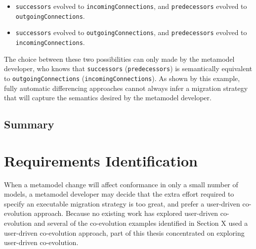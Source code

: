 \begin{itemize}
	\item \texttt{successors} evolved to \texttt{incomingConnections}, and \texttt{predecessors} evolved to \texttt{outgoingConnections}.
	\item \texttt{successors} evolved to \texttt{outgoingConnections}, and \texttt{predecessors} evolved to \texttt{incomingConnections}.
\end{itemize}

The choice between these two possibilities can only made by the metamodel developer, who knows that \texttt{successors} (\texttt{predecessors}) is semantically equivalent to \texttt{outgoingConnections} (\texttt{incomingConnections}). As shown by this example, fully automatic differencing approaches cannot always infer a migration strategy that will capture the semantics desired by the metamodel developer.


\subsection{Summary}


\section{Requirements Identification}
\label{sec:requirements_identification}


When a metamodel change will affect conformance in only a small number of models, a metamodel developer may decide that the extra effort required to specify an executable migration strategy is too great, and prefer a user-driven co-evolution approach. Because no existing work has explored user-driven co-evolution and several of the co-evolution examples identified in Section X used a user-driven co-evolution approach, part of this thesis concentrated on exploring user-driven co-evolution.




